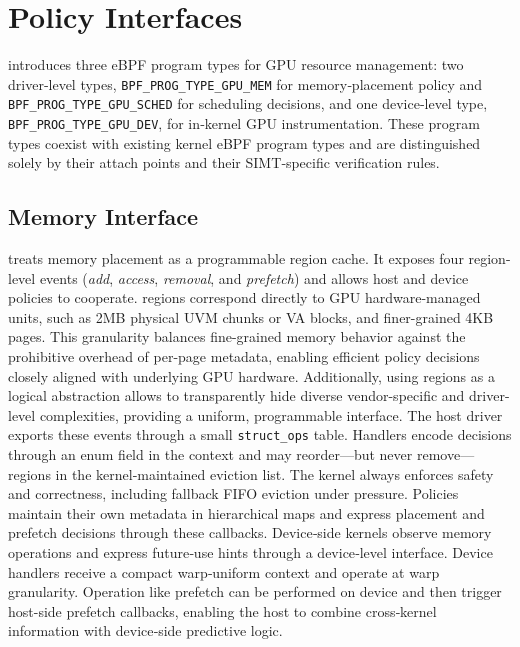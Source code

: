 \section{\sys{} Policy Interfaces}
\label{sec:design-interfaces}

\sys introduces three eBPF program types for GPU resource management: two driver‑level types, \texttt{BPF\_PROG\_TYPE\_GPU\_MEM} for memory‑placement policy and \texttt{BPF\_PROG\_TYPE\_GPU\_SCHED} for scheduling decisions, and one device‑level type, \texttt{BPF\_PROG\_TYPE\_GPU\_DEV}, for in‑kernel GPU instrumentation. These program types coexist with existing kernel eBPF program types and are distinguished solely by their attach points and their SIMT‑specific verification rules.

\subsection{Memory Interface}
\label{sec:design-mem}

\sys treats memory placement as a programmable region cache. It exposes four region-level events (\emph{add}, \emph{access}, \emph{removal}, and \emph{prefetch}) and allows host and device policies to cooperate. \sys regions correspond directly to GPU hardware-managed units, such as 2MB physical UVM chunks or VA blocks, and finer-grained 4KB pages. This granularity balances fine-grained memory behavior against the prohibitive overhead of per-page metadata, enabling efficient policy decisions closely aligned with underlying GPU hardware. Additionally, using regions as a logical abstraction allows \sys to transparently hide diverse vendor-specific and driver-level complexities, providing a uniform, programmable interface. The host driver exports these events through a small \texttt{struct\_ops} table. Handlers encode decisions through an enum field in the context and may reorder—but never remove—regions in the kernel‑maintained eviction list. The kernel always enforces safety and correctness, including fallback FIFO eviction under pressure. Policies maintain their own metadata in hierarchical maps and express placement and prefetch decisions through these callbacks. Device‑side kernels observe memory operations and express future‑use hints through a device‑level interface. Device handlers receive a compact warp‑uniform context and operate at warp granularity. Operation like prefetch can be performed on device and then trigger host-side prefetch callbacks, enabling the host to combine cross‑kernel information with device‑side predictive logic.


